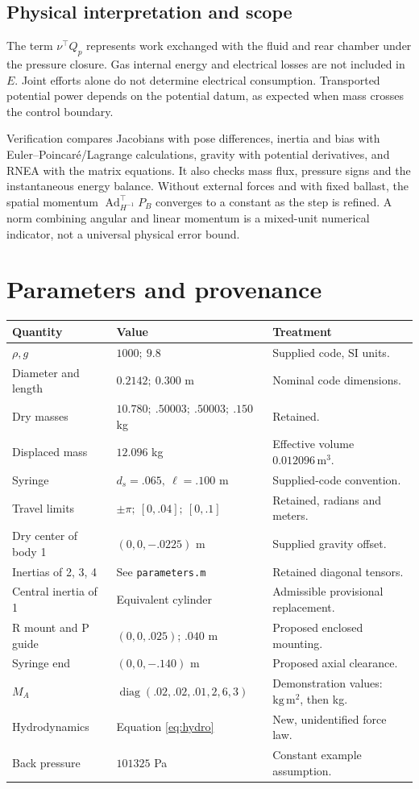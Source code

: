 \documentclass[11pt,a4paper]{article}
\DeclareMathOperator{\Ad}{Ad}\DeclareMathOperator{\ad}{ad}\DeclareMathOperator{\diag}{diag}
\begin{document}
\subsection{Physical interpretation and scope}
The term \(\nu^\top Q_p\) represents work exchanged with the fluid and
rear chamber under the pressure closure. Gas internal energy and
electrical losses are not included in \(E\). Joint efforts alone do
not determine electrical consumption. Transported potential power
depends on the potential datum, as expected when mass crosses the
control boundary.

Verification compares Jacobians with pose differences, inertia and bias
with Euler--Poincar\'e/Lagrange calculations, gravity with potential
derivatives, and RNEA with the matrix equations. It also checks mass flux,
pressure signs and the instantaneous energy balance. Without external
forces and with fixed ballast, the spatial momentum
\(\Ad_{H^{-1}}^\top P_B\) converges to a constant as the step is refined.
A norm combining angular and linear momentum is a mixed-unit numerical
indicator, not a universal physical error bound.
\clearpage

\section{Parameters and provenance}
\begin{tabularx}{\textwidth}{@{}l l X@{}}\toprule
Quantity & Value & Treatment\\\midrule
\(\rho,g\) & \(1000;\ 9.8\) & Supplied code, SI units.\\
Diameter and length & \(0.2142;\ 0.300\) m & Nominal code dimensions.\\
Dry masses & \(10.780;\ .50003;\ .50003;\ .150\) kg & Retained.\\
Displaced mass & \(12.096\) kg & Effective volume \(0.012096\,\mathrm{m^3}\).\\
Syringe & \(d_s=.065,\ \ell=.100\) m & Supplied-code convention.\\
Travel limits & \(\pm\pi;\ [0,.04];\ [0,.1]\) & Retained, radians and meters.\\
Dry center of body 1 & \((0,0,-.0225)\) m & Supplied gravity offset.\\
Inertias of 2, 3, 4 & See \texttt{parameters.m} & Retained diagonal tensors.\\
Central inertia of 1 & Equivalent cylinder & Admissible provisional replacement.\\
R mount and P guide & \((0,0,.025)\); \(.040\) m & Proposed enclosed mounting.\\
Syringe end & \((0,0,-.140)\) m & Proposed axial clearance.\\
\(M_A\) & \(\diag(.02,.02,.01,2,6,3)\) & Demonstration values: \(\mathrm{kg\,m^2}\), then kg.\\
Hydrodynamics & Equation \eqref{eq:hydro} & New, unidentified force law.\\
Back pressure & \(101325\) Pa & Constant example assumption.\\\bottomrule
\end{tabularx}
\end{document}

